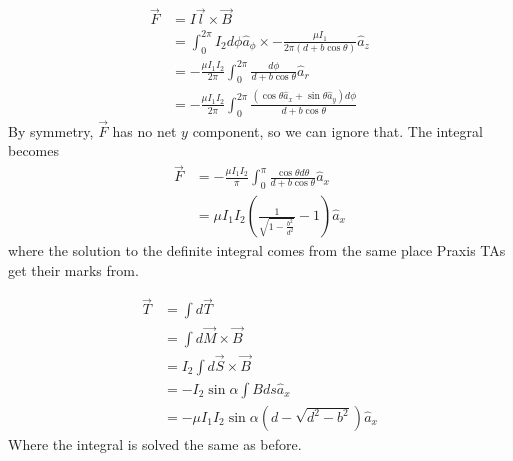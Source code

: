 \documentclass[answers]{exam}
\begin{document}
\begin{questions}

\begin{solution}
    \begin{align*}
        \vec F &= I\vec l \times \vec B \\
               &= \int_0^{2\pi} I_2 d\phi \hat a_\phi \times -\frac{\mu I_1}{2\pi(d+b\cos\theta)} \hat a_z \\
               &= -\frac{\mu I_1I_2}{2\pi} \int_0^{2\pi} \frac{d\phi}{d+b\cos\theta} \hat a_r \\
               &= -\frac{\mu I_1I_2}{2\pi} \int_0^{2\pi} \frac{(\cos\theta\hat a_x + \sin\theta\hat a_y)d\phi}{d+b\cos\theta}
    \end{align*}
    By symmetry, $\vec F$ has no net $y$ component, so we can ignore that. The integral becomes
    \begin{align*}
        \vec F &= -\frac{\mu I_1I_2}{\pi} \int_0^\pi \frac{\cos\theta d\theta}{d + b\cos\theta} \hat a_x \\
               &= \mu I_1I_2 \left(\frac{1}{\sqrt{1-\frac{b^2}{d^2}}} - 1\right) \hat a_x
    \end{align*}
    where the solution to the definite integral comes from the same place Praxis TAs get their marks from.
\end{solution}


\begin{solution}
    \begin{align*}
        \vec T &= \int d\vec T \\
          &= \int d\vec M \times \vec B \\
          &= I_2 \int d\vec S \times \vec B \\
          &= -I_2 \sin\alpha \int Bds \hat a_x \\
          &= -\mu I_1I_2 \sin\alpha (d-\sqrt{d^2-b^2}) \hat a_x
    \end{align*}
    Where the integral is solved the same as before.
\end{solution}



\end{questions}
\end{document}
